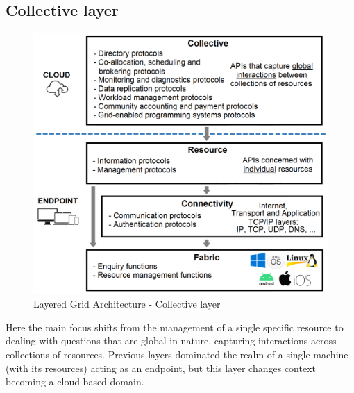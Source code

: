 \subsection{Collective layer}
\begin{figure}[!ht]
    \centering
    \includegraphics[scale=0.34]{document/chapters/chapter_2/images/collective_layer.png}
    \caption{Layered Grid Architecture - Collective layer}
    \label{fig:collective_layer}
\end{figure}

\noindent Here the main focus shifts from the management of a single specific resource to dealing with questions that are global in nature, capturing interactions across collections of resources. Previous layers dominated the realm of a single machine (with its resources) acting as an endpoint, but this layer changes context becoming a cloud-based domain.

